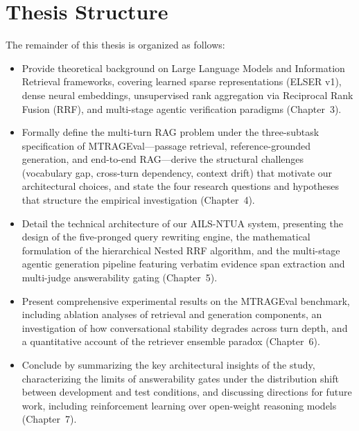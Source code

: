 \section{Thesis Structure}
\label{sec:intro-structure}

The remainder of this thesis is organized as follows:
\begin{itemize}
    \item Provide theoretical background on Large Language Models and Information Retrieval frameworks, covering learned sparse representations (ELSER v1), dense neural embeddings, unsupervised rank aggregation via Reciprocal Rank Fusion (RRF), and multi-stage agentic verification paradigms (Chapter~3).
    \item Formally define the multi-turn RAG problem under the three-subtask specification of MTRAGEval---passage retrieval, reference-grounded generation, and end-to-end RAG---derive the structural challenges (vocabulary gap, cross-turn dependency, context drift) that motivate our architectural choices, and state the four research questions and hypotheses that structure the empirical investigation (Chapter~4).
    \item Detail the technical architecture of our AILS-NTUA system, presenting the design of the five-pronged query rewriting engine, the mathematical formulation of the hierarchical Nested RRF algorithm, and the multi-stage agentic generation pipeline featuring verbatim evidence span extraction and multi-judge answerability gating (Chapter~5).
    \item Present comprehensive experimental results on the MTRAGEval benchmark, including ablation analyses of retrieval and generation components, an investigation of how conversational stability degrades across turn depth, and a quantitative account of the retriever ensemble paradox (Chapter~6).
    \item Conclude by summarizing the key architectural insights of the study, characterizing the limits of answerability gates under the distribution shift between development and test conditions, and discussing directions for future work, including reinforcement learning over open-weight reasoning models (Chapter~7).
\end{itemize}
